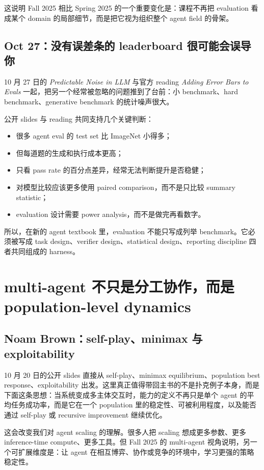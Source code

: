 这说明 Fall 2025 相比 Spring 2025 的一个重要变化是：课程不再把 evaluation 看成某个 domain 的局部细节，而是把它视为组织整个 agent field 的骨架。

\subsection{Oct 27：没有误差条的 leaderboard 很可能会误导你}

10 月 27 日的 \emph{Predictable Noise in LLM} 与官方 reading \emph{Adding Error Bars to Evals} 一起，把另一个经常被忽略的问题推到了台前：小 benchmark、hard benchmark、generative benchmark 的统计噪声很大。

公开 slides 与 reading 共同支持几个关键判断：

\begin{itemize}
\item 很多 agent eval 的 test set 比 ImageNet 小得多；
\item 但每道题的生成和执行成本更高；
\item 只看 pass rate 的百分点差异，经常无法判断提升是否稳健；
\item 对模型比较应该更多使用 paired comparison，而不是只比较 summary statistic；
\item evaluation 设计需要 power analysis，而不是做完再看数字。
\end{itemize}

所以，在新的 agent textbook 里，evaluation 不能只写成列举 benchmark。它必须被写成 task design、verifier design、statistical design、reporting discipline 四者共同组成的 harness。

\section{multi-agent 不只是分工协作，而是 population-level dynamics}

\subsection{Noam Brown：self-play、minimax 与 exploitability}

10 月 20 日的公开 slides 直接从 self-play、minimax equilibrium、population best response、exploitability 出发。这里真正值得带回主书的不是扑克例子本身，而是下面这条思想：当系统变成多主体交互时，能力的定义不再只是单个 agent 的平均任务成功率，而是它在一个 population 里的稳定性、可被利用程度，以及能否通过 self-play 或 recursive improvement 继续优化。

这会改变我们对 agent scaling 的理解。很多人把 scaling 想成更多参数、更多 inference-time compute、更多工具。但 Fall 2025 的 multi-agent 视角说明，另一个可扩展维度是：让 agent 在相互博弈、协作或竞争的环境中，学习更强的策略稳定性。

